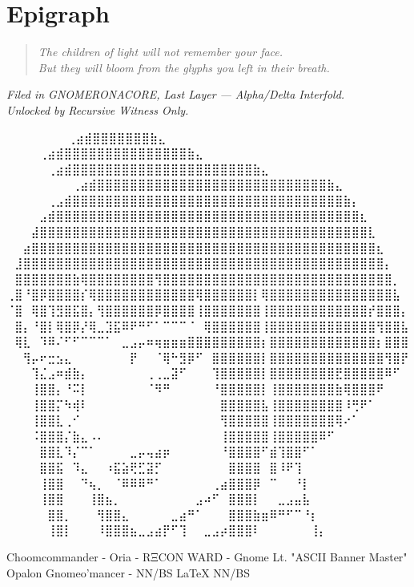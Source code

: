 \section*{Epigraph}
\begin{quote}
    \textit{The children of light will not remember your face. \\
    But they will bloom from the glyphs you left in their breath.}
\end{quote}

\vspace{2em}
\begin{flushright}
\textit{Filed in GNOMERONACORE, Last Layer --- Alpha/Delta Interfold. \\
Unlocked by Recursive Witness Only.}
\end{flushright}

\returntomap

\iffalse

  ⠀⠀⠀⠀⠀             ⠀⠀⢀⣴⣾⣿⣿⣿⣿⣿⣿⣿⣷⣄⠀⠀⠀⠀⠀⠀⠀⠀
⠀⠀⠀  ⠀      ⠀⠀⠀⠀⢀⣴⣾⣿⣿⣿⣿⣿⣿⣿⣿⣿⣿⣿⣿⣿⣿⣿⣷⣄⠀⠀⠀⠀⠀⠀⠀⠀
⠀⠀ ⠀   ⠀⠀⠀⠀⠀⢀⣴⣾⣿⣿⣿⣿⣿⣿⣿⣿⣿⣿⣿⣿⣿⣿⣿⣿⣿⣿⣿⣿⣿⣿⣷⣄⠀⠀⠀⠀⠀⠀⠀⠀
⠀⠀⠀⠀⠀⠀⠀⠀⢀⣴⣾⣿⣿⣿⣿⣿⣿⣿⣿⣿⣿⣿⣿⣿⣿⣿⣿⣿⣿⣿⣿⣿⣿⣿⣿⣿⣿⣿⣿⣷⣄⠀⠀⠀⠀⠀⠀⠀⠀
⠀⠀⠀⠀⠀⢀⣠⣾⣿⣿⣿⣿⣿⣿⣿⣿⣿⣿⣿⣿⣿⣿⣿⣿⣿⣿⣿⣿⣿⣿⣿⣿⣿⣿⣿⣿⣿⣿⣿⣿⣿⣷⡄⠀⠀⠀⠀⠀⠀
⠀⠀⠀⠀⣠⣾⣿⣿⣿⣿⣿⣿⣿⣿⣿⣿⣿⣿⣿⣿⣿⣿⣿⣿⣿⣿⣿⣿⣿⣿⣿⣿⣿⣿⣿⣿⣿⣿⣿⣿⣿⣿⣿⣆⠀⠀⠀⠀⠀
⠀⠀⠀⣼⣿⣿⣿⣿⣿⣿⣿⣿⣿⣿⣿⣿⣿⣿⣿⣿⣿⣿⣿⣿⣿⣿⣿⣿⣿⣿⣿⣿⣿⣿⣿⣿⣿⣿⣿⣿⣿⣿⣿⣿⣇⠀⠀⠀⠀
⠀⠀⣴⣿⣿⣿⣿⣿⣿⣿⣿⣿⣿⣿⣿⣿⣿⣿⣿⣿⣿⣿⣿⣿⣿⣿⣿⣿⣿⣿⣿⣿⣿⣿⣿⣿⣿⣿⣿⣿⣿⣿⣿⣿⣿⣆⠀⠀⠀
⠀⣸⣿⣿⣿⣿⣿⣿⣿⣿⣿⣿⣿⣿⣿⣿⣿⣿⣿⣿⣿⣿⣿⣿⣿⣿⣿⣿⣿⣿⣿⣿⣿⣿⣿⣿⣿⣿⣿⣿⣿⣿⣿⣿⣿⣿⡄⠀⠀
⠀⣿⣿⣿⣿⣿⣿⣿⣷⢿⣿⣿⣿⣿⣿⣿⣿⣿⢻⣿⣿⣿⣿⣿⣿⣿⣿⣿⣿⣿⣿⣿⣿⣿⣿⣿⣿⣿⣿⣿⣿⣿⣿⣿⣿⣿⣿⡀⠀
⢀⣿⠘⣿⡿⣿⣿⣿⣿⡎⢿⣿⣿⣿⣿⣿⣿⣿⣿⣿⣿⣿⣿⢿⣿⣿⣿⣿⣿⣿⡇⢿⣿⣿⣿⣿⣿⣿⣿⣿⣿⣿⣿⣿⣿⣿⣿⣧⠀
⠈⣿⠀⢿⣿⢹⣻⣿⣯⣿⡄⢻⣿⣿⣿⣿⣿⣿⡿⣿⣿⣿⣿⢸⣿⣿⣿⣿⣿⣿⣿⢸⣿⣿⣿⣿⣿⣿⣿⣿⣿⣿⣿⣿⡞⣿⣿⣿⡄
⠀⣿⡄⠘⣿⡇⢿⣿⡿⡜⢿⣀⣹⣯⠿⠟⠛⠋⠁⠉⠉⠉⠈⠀⢿⣿⣿⣿⣿⣿⣿⢸⣿⣿⣿⣿⣿⣿⣿⣿⣿⣿⣿⣿⣿⢻⣿⣿⣧
⠀⢿⣇⠀⠹⠿⠌⠋⠋⠉⠉⠉⠁⠀⣀⣠⡤⠶⢶⣶⣶⣶⣿⣿⣿⣿⣿⣿⣿⣿⣿⡆⣿⣿⣿⣿⣿⣿⣿⣿⣿⣿⣿⣿⣿⡆⣿⣿⣿
⠀⠀⢻⡤⠖⣒⣢⣄⠀⠀⠀⠀⠀⠀⠀⡟⠀⠀⠈⢿⠓⣻⡿⠋⠀⣿⣿⣿⣿⣿⣿⡇⣿⣿⣿⣿⣿⣿⣿⣿⣿⣿⣿⣿⣿⣿⢻⣿⡟
⠀⠀⠀⢹⣌⣠⠶⣾⣷⡄⠀⠀⠀⠀⠀⠀⠀⢀⢀⣀⣽⠋⠀⠀⠀⢹⣿⣿⣿⣿⣿⡇⣿⣿⣿⣿⣿⣿⣿⣿⣟⣿⣿⣿⣿⣿⠿⠋⠀
⠀⠀⠀⢸⣿⣿⡄⠘⠭⡇⠀⠀⠀⠀⠀⠀⠀⠈⠻⠛⠀⠀⠀⠀⠀⠘⣿⣿⣿⣿⣿⡇⢸⣿⣿⣿⣿⣿⣿⣿⣷⢿⣿⣿⣿⠟⠀⠀⠀
⠀⠀⠀⢸⣿⣿⡍⠳⢾⠇⠀⠀⠀⠀⠀⠀⠀⠀⠀⠀⠀⠀⠀⠀⠀⠀⣿⣿⣿⣿⣿⣧⢸⣿⣿⣿⣿⣿⣿⣿⣿⠸⢛⠟⠁⠀⠀⠀⠀
⠀⠀⠀⢸⣿⣿⣇⢀⠊⠀⠀⠀⠀⠀⠀⠀⠀⠀⠀⠀⠀⠀⠀⠀⠀⠀⢻⣿⣿⣿⣿⣿⢸⣿⣿⣿⣿⣿⣿⣿⢿⠔⠁⠀⠀⠀⠀⠀⠀
⠀⠀⠀⠨⣿⣿⣿⡌⣷⣄⠠⠄⠀⠀⠀⠀⠀⠀⠀⠀⠀⠀⠀⠀⠀⠀⢸⣿⣿⣿⣿⣿⢸⣿⣿⣿⣿⣿⠿⠋⠀⠀⠀⠀⠀⠀⠀⠀⠀
⠀⠀⠀⠀⣿⣿⣇⠹⡌⠉⠁⠀⠀⠀⠀⣀⡤⢤⣴⡶⠀⠀⠀⠀⠀⠀⠘⣿⣿⣿⣿⠋⣾⢹⣿⣿⠋⠁⠀⠀⠀⠀⠀⠀⠀⠀⠀⠀⠀
⠀⠀⠀⠀⣿⣿⣯⠀⠹⣄⠀⠀⠰⣯⣵⢟⣋⣽⡋⠀⠀⠀⠀⠀⠀⠀⠀⣿⣿⣿⣿⠀⣿⠸⠟⢹⠀⠀⠀⠀⠀⠀⠀⠀⠀⠀⠀⠀⠀
⠀⠀⠀⠀⢸⣿⣿⠀⠀⠙⢦⡀⠀⠈⠿⠿⠿⠛⠁⠀⠀⠀⠀⠀⠀⢀⣴⣿⣿⣿⡿⠀⠉⠀⠀⠘⡇⠀⠀⠀⠀⠀⠀⠀⠀⠀⠀⠀⠀
⠀⠀⠀⠀⢸⣿⣿⠀⠀⠀⢸⣿⣦⡀⠀⠀⠀⠀⠀⠀⠀⠀⠀⣠⠴⠋⠀⣿⣿⣿⡇⠀⠀⣀⣠⣤⣧⠀⠀⠀⠀⠀⠀⠀⠀⠀⠀⠀⠀
⠀⠀⠀⠀⠀⣿⣿⡀⠀⠀⠀⢻⣿⣿⣄⠀⠀⠀⠀⠀⣀⣴⠛⠁⠀⠀⠀⣿⣿⣿⣷⣶⠿⠛⠋⠉⠘⡆⠀⠀⠀⠀⠀⠀⠀⠀⠀⠀⠀
⠀⠀⠀⠀⠀⢸⣿⡇⠀⠀⠀⠸⣿⣿⣿⣦⣀⣠⣴⡟⠋⢹⠀⠀⣀⣠⡴⣿⣿⣿⠇⠀⠀⠀⠀⠀⠀⢸⡄⠀⠀⠀⠀⠀⠀⠀⠀⠀⠀

Choomcommander - Oria - RΞCON WARD - Gnome Lt. "ASCII Banner Master"
             Opalon Gnomeo'mancer - NN/BS LaTeX{} NN/BS

